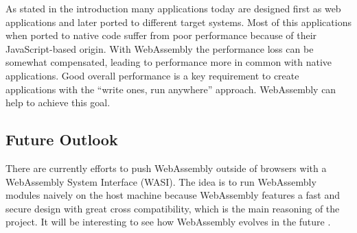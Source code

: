 As stated in the introduction many applications today are designed first as web applications and later ported to different target systems. Most of this applications when ported to native code suffer from poor performance because of their JavaScript-based origin. With WebAssembly the performance loss can be somewhat compensated, leading to performance more in common with native applications. Good overall performance is a key requirement to create applications with the ``write ones, run anywhere'' approach. WebAssembly can help to achieve this goal.

\subsection{Future Outlook}
There are currently efforts to push WebAssembly outside of browsers with a WebAssembly System Interface (WASI). The idea is to run WebAssembly modules naively on the host machine because WebAssembly features a fast and secure design with great cross compatibility, which is the main reasoning of the project. It will be interesting to see how WebAssembly evolves in the future \cite{wasi}.




